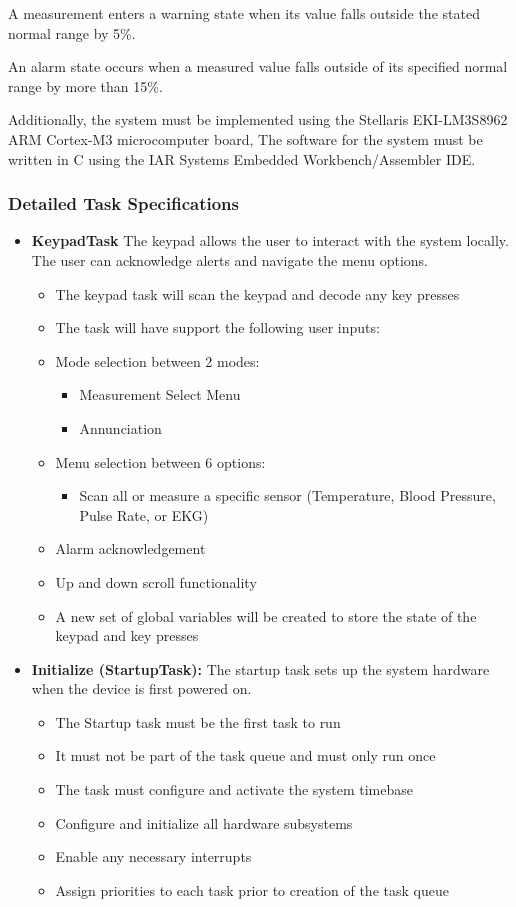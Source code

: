 \documentclass[12pt]{article} %
\begin{document}
A measurement enters a warning state when its value falls outside the stated 
normal range by 5\%. 

An alarm state occurs when a measured value falls outside of its specified
normal range by more than 15\%.

Additionally, the system must be implemented using the Stellaris 
EKI-LM3S8962 ARM Cortex-M3 microcomputer board, The software for the system 
must be written in C using the IAR Systems Embedded Workbench/Assembler IDE.

\subsubsection{Detailed Task Specifications}

\begin{itemize}
	\item \textbf{KeypadTask}
		The keypad allows the user to interact with the system locally. The user
		can acknowledge alerts and navigate the menu options.
    \begin{itemize}
      \item The keypad task will scan the keypad and decode any key presses
      \item The task will have support the following user inputs:
      \item Mode selection between 2 modes:
				\begin{itemize}
					\item Measurement Select Menu
					\item Annunciation
				\end{itemize}
      \item Menu selection between 6 options:
				\begin{itemize}
					\item Scan all or measure a specific sensor (Temperature, Blood
						Pressure, Pulse Rate, or EKG)
				\end{itemize}
      \item Alarm acknowledgement
      \item Up and down scroll functionality 
      \item A new set of global variables will be created to store the state of the keypad and key presses
    \end{itemize}

	\item \textbf{Initialize (StartupTask):}
		The startup task sets up the system hardware when the device is first powered on.
    \begin{itemize}
			\item The Startup task must be the first task to run
			\item It must not be part of the task queue and must only run once
			\item The task must configure and activate the system timebase
			\item Configure and initialize all hardware subsystems
			\item Enable any necessary interrupts
			\item Assign priorities to each task prior to creation of the task queue
    \end{itemize}


\end{itemize}
\end{document}
